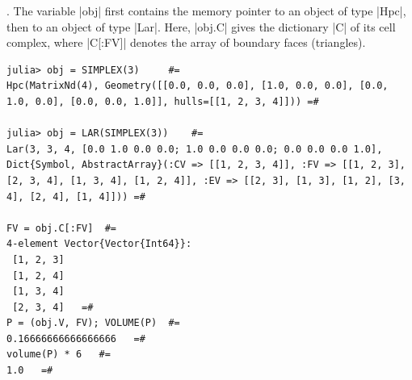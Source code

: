 \begin{coding}.
The variable |obj| first contains the memory pointer to an object of type |Hpc|, then to an object of type |Lar|. Here, |obj.C| gives the dictionary |C| of its cell complex, where |C[:FV]| denotes the array of boundary faces (triangles).
\begin{lstlisting}[language=JuliaLocal, style=julia, mathescape = true]
julia> obj = SIMPLEX(3) 	#=
Hpc(MatrixNd(4), Geometry([[0.0, 0.0, 0.0], [1.0, 0.0, 0.0], [0.0, 1.0, 0.0], [0.0, 0.0, 1.0]], hulls=[[1, 2, 3, 4]])) =#		

julia> obj = LAR(SIMPLEX(3)) 	#=
Lar(3, 3, 4, [0.0 1.0 0.0 0.0; 1.0 0.0 0.0 0.0; 0.0 0.0 0.0 1.0], Dict{Symbol, AbstractArray}(:CV => [[1, 2, 3, 4]], :FV => [[1, 2, 3], [2, 3, 4], [1, 3, 4], [1, 2, 4]], :EV => [[2, 3], [1, 3], [1, 2], [3, 4], [2, 4], [1, 4]])) =#	

FV = obj.C[:FV]  #=
4-element Vector{Vector{Int64}}:
 [1, 2, 3]
 [1, 2, 4]
 [1, 3, 4]
 [2, 3, 4]   =#
P = (obj.V, FV); VOLUME(P)  #=
0.16666666666666666   =#
volume(P) * 6   #=
1.0   =#
\end{lstlisting}
\end{coding}


